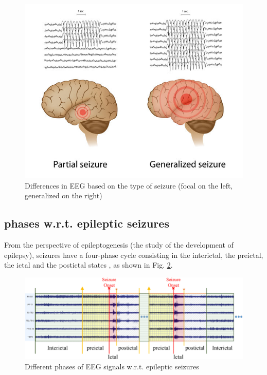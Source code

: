\begin{figure}[t]
    \centering
    \includegraphics[width=1.0\textwidth]{images/Th-background/eeg-seizure-partial-generalized.jpg}
    \caption{Differences in EEG based on the type of seizure (focal on the left, generalized on the right)          \cite{bates_epileptic_2018}}
    \label{fig:eeg-seizure-partial-generalized}
\end{figure}

\subsection{ phases w.r.t. epileptic seizures} \label{subsec:seizure-phases}
From the perspective of epileptogenesis \cite{aminoff_encyclopedia_2014} (the study of the development of epilepsy), seizures have a four-phase cycle consisting in the interictal, the preictal, the ictal and the postictal states \cite{cui_learning_2018, epilepsy_foundation_seizure_nodate, heidi_moawad_your_2020}, as shown in Fig. \ref{fig:seizure-phases}.

\begin{figure}[ht]
    \centering
    \includegraphics[width=1.0\textwidth]{images/Th-background/seizure-phases.png}
    \caption{Different phases of EEG signals w.r.t. epileptic seizures \cite{cui_learning_2018}}
    \label{fig:seizure-phases}
\end{figure}

